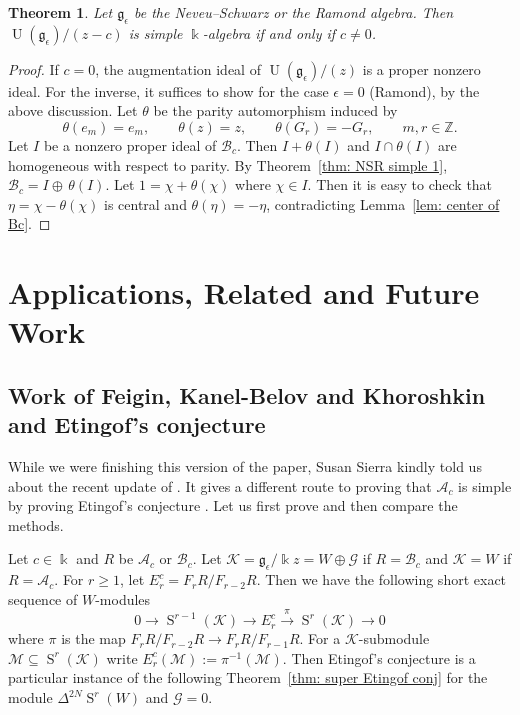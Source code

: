 \documentclass[12pt]{amsart}
\theoremstyle{plain}
\newtheorem{theorem}{Theorem}[section]
\theoremstyle{definition}
\numberwithin{equation}{theorem}
\newcommand{\kk}{\Bbbk}
\newcommand{\Sa}{\operatorname{S}}
\newcommand{\UU}{\operatorname{U}}
\newcommand{\ZZ}{\mathbb{Z}}
\newcommand{\mc}[1]{\mathcal{#1}}
\newcommand{\calA}{\mathcal A}
\newcommand{\calB}{\mathcal B}
\newcommand{\geps}{\mathfrak{g}_\epsilon}
\begin{document}
\begin{theorem}\label{thm: NSR simple 2}
    Let $\geps$ be the Neveu--Schwarz or the Ramond algebra. Then $\UU(\geps)/(z-c)$ is simple $\kk$-algebra if and only if $c \neq 0$. 
\end{theorem}
\begin{proof}
    If $c=0$, the augmentation ideal of $\UU(\geps)/(z)$ is a proper nonzero ideal. For the inverse, it suffices to show for the case $\epsilon = 0$ (Ramond), by the above discussion. Let $\theta$ be the parity automorphism induced by 
    \[\theta(e_m) = e_m, \qquad \theta(z) = z, \qquad \theta(G_r) = -G_r, \qquad m, r \in \ZZ.\] 
    Let $I$ be a nonzero proper ideal of $\calB_c$. Then $I + \theta(I)$ and $I \cap \theta(I)$ are homogeneous with respect to parity. By Theorem~\ref{thm: NSR simple 1}, $\calB_c = I \oplus \, \theta(I)$. Let $1 = \chi+\theta(\chi)$ where $\chi \in I$. Then it is easy to check that $\eta = \chi-\theta(\chi)$ is central and $\theta(\eta) = -\eta$, contradicting Lemma~\ref{lem: center of Bc}.
\end{proof}
 

\section{Applications, Related and Future Work}\label{sec: app}

\subsection{Work of Feigin, Kanel-Belov and Khoroshkin and Etingof's conjecture}\label{subsec: FKBK work}
While we were finishing this version of the paper, Susan Sierra kindly told us about the recent update of \cite{FeiginKanelKhoroshkin}. It gives a different route to proving that $\calA_c$ is simple by proving Etingof's conjecture \cite[Conjecture 4.8]{FeiginKanelKhoroshkin}. Let us first prove \cite[Conjecture 4.8]{FeiginKanelKhoroshkin} and then compare the methods. 

Let $c \in \kk$ and $R$ be $\calA_c$ or $\calB_c$. Let $\mc{K} = \geps/ \kk z = W \oplus \mc{G}$ if $R = \calB_c$ and $\mc{K} = W$ if $R= \calA_c$. For $r \geq 1$, let $E^c_r = F_r R/F_{r-2} R$. Then we have the following short exact sequence of $W$-modules 
\[0 \longrightarrow \Sa^{r-1}(\mc{K}) \longrightarrow E^c_r \stackrel{\pi}{\longrightarrow} \Sa^{r}(\mc{K}) \longrightarrow 0\]
where $\pi$ is the map $F_r R/F_{r-2} R \to F_r R/F_{r-1} R$. For a $\mc{K}$-submodule $\mc{M} \subseteq  \Sa^r(\mc{K})$ write $E^c_r(\mc{M}) := \pi^{-1}(\mc{M})$. Then Etingof's conjecture \cite[Conjecture 4.8]{FeiginKanelKhoroshkin} is a particular instance of the following Theorem~\ref{thm: super Etingof conj} for the module $\Delta^{2N}\Sa^{r}(W)$ and $\mc{G} = 0$. 
\end{document}
